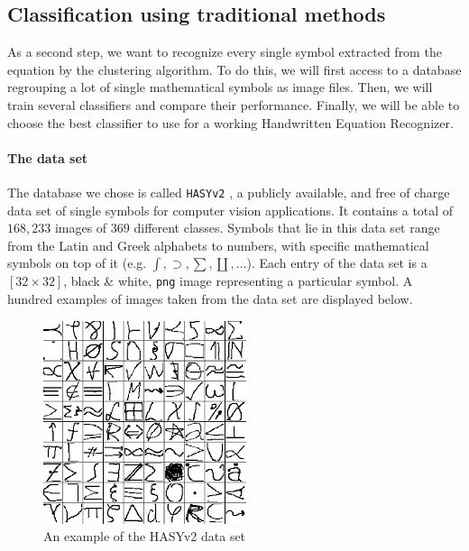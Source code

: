 \documentclass[twocolumn]{article}%
\begin{document}
	\subsection{Classification using traditional methods}
		As a second step, we want to recognize every single symbol extracted from the equation by the clustering algorithm. To do this, we will first access to a database regrouping a lot of single mathematical symbols as image files. Then, we will train several classifiers and compare their performance. Finally, we will be able to choose the best classifier to use for a working Handwritten Equation Recognizer.
		
	\paragraph{The data set}
	The database we chose is called \texttt{HASYv2} \cite{hasyv2}, a publicly available, and free of charge data set of
single symbols for computer vision applications. It contains a total of $168,233$ images of $369$ different classes. Symbols that lie in this data set range from the Latin and Greek alphabets to numbers, with specific mathematical symbols on top of it (e.g. $\int, \supset, \sum, \coprod, ...$). Each entry of the data set is a $[32\times32]$, black \& white, \texttt{png} image representing a particular symbol. A hundred examples of images taken from the data set are displayed below.

	\begin{figure}[htp]
	\centering
	\includegraphics[scale=0.9]{images/hasyv2.png}
	\caption{An example of the HASYv2 data set}
	\end{figure}
\end{document}
